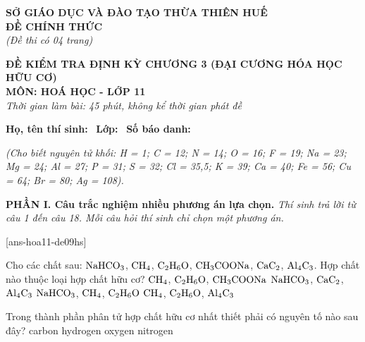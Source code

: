 \documentclass[12pt,a4paper]{article}
\begin{document}
\thispagestyle{firstpage}

\noindent
\begin{minipage}[t]{0.44\textwidth}
	\centering\fontsize{10pt}{12pt}\selectfont
	\textbf{SỞ GIÁO DỤC VÀ ĐÀO TẠO THỪA THIÊN HUẾ}\\
	\textbf{ĐỀ CHÍNH THỨC}\\
	\textit{(Đề thi có 04 trang)}
\end{minipage}\hfill
\begin{minipage}[t]{0.54\textwidth}
	\centering\fontsize{10.5pt}{13pt}\selectfont
	\textbf{ĐỀ KIỂM TRA ĐỊNH KỲ CHƯƠNG 3 (ĐẠI CƯƠNG HÓA HỌC HỮU CƠ)}\\
	\textbf{MÔN: HOÁ HỌC - LỚP 11}\\
	\textit{Thời gian làm bài: 45 phút, không kể thời gian phát đề}
	
	\smallskip
\end{minipage}

\smallskip
\noindent\hrulefill
\smallskip

\noindent\textbf{Họ, tên thí sinh:} \dotfill\ \textbf{Lớp:} \dotfill\ \textbf{Số báo danh:} \dotfill

\smallskip
\noindent\textit{(Cho biết nguyên tử khối: H = 1; C = 12; N = 14; O = 16; F = 19; Na = 23; Mg = 24; Al = 27; P = 31; S = 32; Cl = 35,5; K = 39; Ca = 40; Fe = 56; Cu = 64; Br = 80; Ag = 108).}
\smallskip

\noindent\textbf{\large PHẦN I. Câu trắc nghiệm nhiều phương án lựa chọn.}
\textit{Thí sinh trả lời từ câu 1 đến câu 18. Mỗi câu hỏi thí sinh chỉ chọn một phương án.}
\vspace{0.2cm}

[ans-hoa11-de09hs]

\begin{ex}
Cho các chất sau: $\ce{NaHCO3}$, $\ce{CH4}$, $\ce{C2H6O}$, $\ce{CH3COONa}$, $\ce{CaC2}$, $\ce{Al4C3}$. Hợp chất nào thuộc loại hợp chất hữu cơ?
\choice
{\True $\ce{CH4}$, $\ce{C2H6O}$, $\ce{CH3COONa}$}
{$\ce{NaHCO3}$, $\ce{CaC2}$, $\ce{Al4C3}$}
{$\ce{NaHCO3}$, $\ce{CH4}$, $\ce{C2H6O}$}
{$\ce{CH4}$, $\ce{C2H6O}$, $\ce{Al4C3}$}

\end{ex}

\begin{ex}
Trong thành phần phân tử hợp chất hữu cơ nhất thiết phải có nguyên tố nào sau đây?
\choice
{\True carbon}
{hydrogen}
{oxygen}
{nitrogen}

\end{ex}
\end{document}
